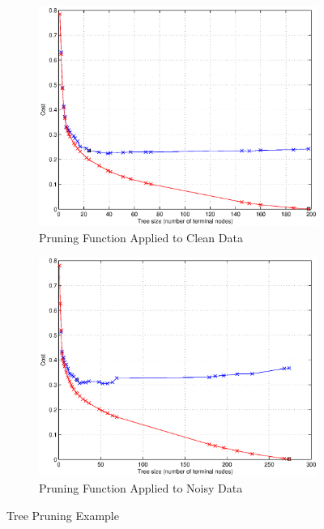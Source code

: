 \documentclass[11pt,a4paper]{article}
\begin{document}
\begin{figure}[!ht]
	\centering
	\begin{subfigure}[b]{0.495\textwidth}
		\includegraphics[width=\textwidth]{images/pruning_clean_data.eps}
     	\caption{Pruning Function Applied to Clean Data}
     	\label{fig:pruningClean}
    \end{subfigure}
	\begin{subfigure}[b]{0.495\textwidth}
		\includegraphics[width=\textwidth]{images/pruning_noisy_data.eps}
     	\caption{Pruning Function Applied to Noisy Data}
     	\label{fig:pruningNoisy}
    \end{subfigure}
    \caption{Tree Pruning Example}
    \label{fig:pruning}
\end{figure}
\end{document}
